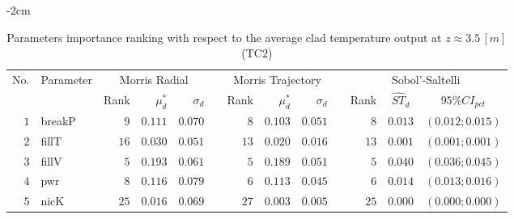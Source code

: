 \begin{table*}[!htbp]\centering
{}
\begin{adjustwidth*}{}{-2cm}
\caption{Parameters importance ranking with respect to the average clad temperature output at $z \approx 3.5 \, [m]$ (TC$2$)}
\label{tab:app_screening_tc2_average}
\begin{tabular}{@{}rlrrrrrrrrrcc@{}}\toprule
\multirow{2}{*}{\footnotesize{No.}} & \multirow{2}{*}{\footnotesize{Parameter}} & \multicolumn{3}{c}{\footnotesize{Morris Radial}} & \phantom{a} & \multicolumn{3}{c}{\footnotesize{Morris Trajectory}}  &\phantom{a}& \multicolumn{3}{c}{\footnotesize{Sobol'-Saltelli}}                               \\             
                                                                                  \cmidrule{3-5}                                                   \cmidrule{7-9}                                                      \cmidrule{11-13}
                                    &                                           & \footnotesize{Rank}   & $\mu^*_d$ & $\sigma_d$   &             & \footnotesize{Rank} & $\mu^*_d$ & $\sigma_d$          &           & \footnotesize{Rank} & \footnotesize{$\hat{ST}_d$} & \footnotesize{$95\%CI_{pct}$}\\ \midrule
\footnotesize{$1 $} & \footnotesize{breakP   } & \footnotesize{$9 $} & \footnotesize{$0.111$} & \footnotesize{$0.070$} && \footnotesize{$8 $} & \footnotesize{$0.103$} & \footnotesize{$0.051$} && \footnotesize{$8 $} & \footnotesize{$0.013$} & \footnotesize{$(0.012;0.015)$} \\
\footnotesize{$2 $} & \footnotesize{fillT    } & \footnotesize{$16$} & \footnotesize{$0.030$} & \footnotesize{$0.051$} && \footnotesize{$13$} & \footnotesize{$0.020$} & \footnotesize{$0.016$} && \footnotesize{$13$} & \footnotesize{$0.001$} & \footnotesize{$(0.001;0.001)$} \\
\footnotesize{$3 $} & \footnotesize{fillV    } & \footnotesize{$5 $} & \footnotesize{$0.193$} & \footnotesize{$0.061$} && \footnotesize{$5 $} & \footnotesize{$0.189$} & \footnotesize{$0.051$} && \footnotesize{$5 $} & \footnotesize{$0.040$} & \footnotesize{$(0.036;0.045)$} \\
\footnotesize{$4 $} & \footnotesize{pwr      } & \footnotesize{$8 $} & \footnotesize{$0.116$} & \footnotesize{$0.079$} && \footnotesize{$6 $} & \footnotesize{$0.113$} & \footnotesize{$0.045$} && \footnotesize{$6 $} & \footnotesize{$0.014$} & \footnotesize{$(0.013;0.016)$} \\
\footnotesize{$5 $} & \footnotesize{nicK     } & \footnotesize{$25$} & \footnotesize{$0.016$} & \footnotesize{$0.069$} && \footnotesize{$27$} & \footnotesize{$0.003$} & \footnotesize{$0.005$} && \footnotesize{$25$} & \footnotesize{$0.000$} & \footnotesize{$(0.000;0.000)$} \\

\end{tabular}
\end{adjustwidth*}
\end{table*}

